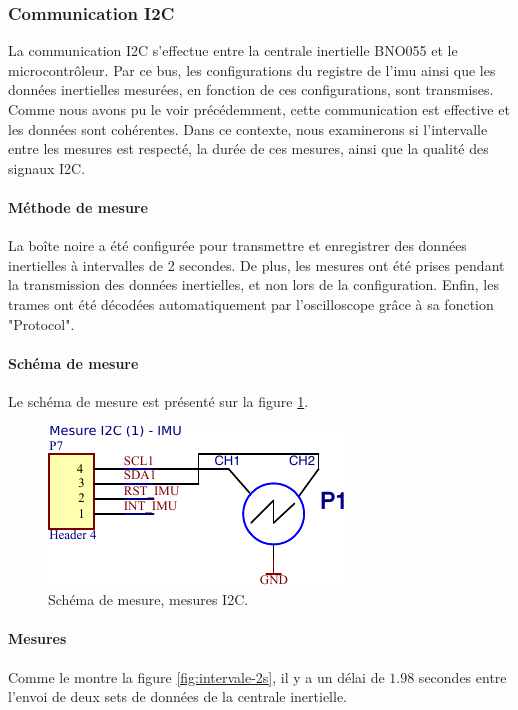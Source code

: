 \subsubsection{Communication I2C} \label{ssec:Comm-I2C}
La communication I2C s'effectue entre la centrale inertielle BNO055 et le microcontrôleur. Par ce bus, les configurations du registre de l'\gls{imu} ainsi que les données inertielles mesurées, en fonction de ces configurations, sont transmises. Comme nous avons pu le voir précédemment, cette communication est effective et les données sont cohérentes. Dans ce contexte, nous examinerons si l'intervalle entre les mesures est respecté, la durée de ces mesures, ainsi que la qualité des signaux I2C.


\paragraph{Méthode de mesure}
La boîte noire a été configurée pour transmettre et enregistrer des données inertielles à intervalles de 2 secondes. De plus, les mesures ont été prises pendant la transmission des données inertielles, et non lors de la configuration. Enfin, les trames ont été décodées automatiquement par l'oscilloscope grâce à sa fonction "Protocol".

\paragraph{Schéma de mesure} Le schéma de mesure est présenté sur la figure \ref{fig:schema-mesure-i2c}.


\begin{figure}[H]
	\centering
	\includegraphics[width=0.4\linewidth]{../figures/mesures/I2C/Schema-mesure-i2c}
	\caption{Schéma de mesure, mesures I2C.}
	\label{fig:schema-mesure-i2c}
\end{figure}

\paragraph{Mesures}
Comme le montre la figure \ref{fig:intervale-2s}, il y a un délai de \underline{$1.98$} secondes entre l'envoi de deux sets de données de la centrale inertielle.



